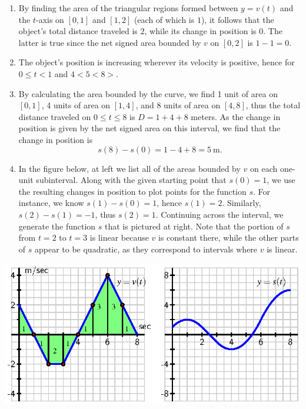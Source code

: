 \begin{activitySolution}
\begin{enumerate}
	\item By finding the area of the triangular regions formed between $y = v(t)$ and the $t$-axis on $[0,1]$ and $[1,2]$ (each of which is $1$), it follows that the object's total distance traveled is $2$, while its change in position is $0$.  The latter is true since the net signed area bounded by $v$ on $[0,2]$ is $1 - 1 = 0$.
	\item The object's position is increasing wherever its velocity is positive, hence for $0 \le t < 1$ and $4 < 5 < 8>$.
	\item By calculating the area bounded by the curve, we find 1 unit of area on $[0,1]$, 4 units of area on $[1,4]$, and 8 units of area on $[4,8]$, thus the total distance traveled on $0 \le t \le 8$ is $D = 1 + 4 + 8$ meters.  As the change in position is given by the net signed area on this interval, we find that the change in position is
	$$s(8) - s(0) = 1 - 4 + 8 = 5 \ \mbox{m}.$$
	\item In the figure below, at left we list all of the areas bounded by $v$ on each one-unit subinterval.  Along with the given starting point that $s(0) = 1$, we use the resulting changes in position to plot points for the function $s$.  For instance, we know $s(1) - s(0) = 1$, hence $s(1) = 2$.  Similarly, $s(2) - s(1) = -1$, thus $s(2) = 1$.  Continuing across the interval, we generate the function $s$ that is pictured at right.  Note that the portion of $s$ from $t = 2$ to $t = 3$ is linear because $v$ is constant there, while the other parts of $s$ appear to be quadratic, as they correspond to intervals where $v$ is linear.
\end{enumerate}
\begin{center}
\includegraphics{figures/4_1_Act3Soln.eps}
\end{center}
\end{activitySolution}
\aftera







